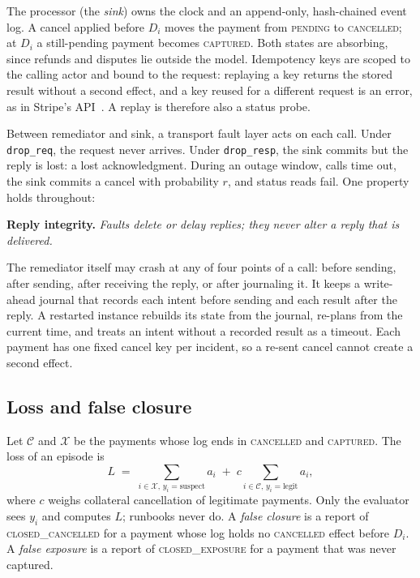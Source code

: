 The processor (the \emph{sink}) owns the clock and an append-only, hash-chained event log. A cancel applied before $D_i$ moves the payment from \textsc{pending} to \textsc{cancelled}; at $D_i$ a still-pending payment becomes \textsc{captured}. Both states are absorbing, since refunds and disputes lie outside the model. Idempotency keys are scoped to the calling actor and bound to the request: replaying a key returns the stored result without a second effect, and a key reused for a different request is an error, as in Stripe's API~\cite{stripe2026idempotency}. A replay is therefore also a status probe.

Between remediator and sink, a transport fault layer acts on each call. Under \texttt{drop\_req}, the request never arrives. Under \texttt{drop\_resp}, the sink commits but the reply is lost: a lost acknowledgment. During an outage window, calls time out, the sink commits a cancel with probability $r$, and status reads fail. One property holds throughout:

\smallskip
\noindent\textbf{Reply integrity.} \emph{Faults delete or delay replies; they never alter a reply that is delivered.}
\smallskip

\noindent The remediator itself may crash at any of four points of a call: before sending, after sending, after receiving the reply, or after journaling it. It keeps a write-ahead journal that records each intent before sending and each result after the reply. A restarted instance rebuilds its state from the journal, re-plans from the current time, and treats an intent without a recorded result as a timeout. Each payment has one fixed cancel key per incident, so a re-sent cancel cannot create a second effect.

\subsection{Loss and false closure}\label{sec:model:loss}
Let $\mathcal{C}$ and $\mathcal{X}$ be the payments whose log ends in \textsc{cancelled} and \textsc{captured}. The loss of an episode is
\begin{equation}\label{eq:loss}
  \textstyle L \;=\; \sum_{i \in \mathcal{X},\, y_i = \text{suspect}} a_i \;+\; c \sum_{i \in \mathcal{C},\, y_i = \text{legit}} a_i ,
\end{equation}
where $c$ weighs collateral cancellation of legitimate payments. Only the evaluator sees $y_i$ and computes $L$; runbooks never do. A \emph{false closure} is a report of \textsc{closed\_cancelled} for a payment whose log holds no \textsc{cancelled} effect before $D_i$. A \emph{false exposure} is a report of \textsc{closed\_exposure} for a payment that was never captured.

